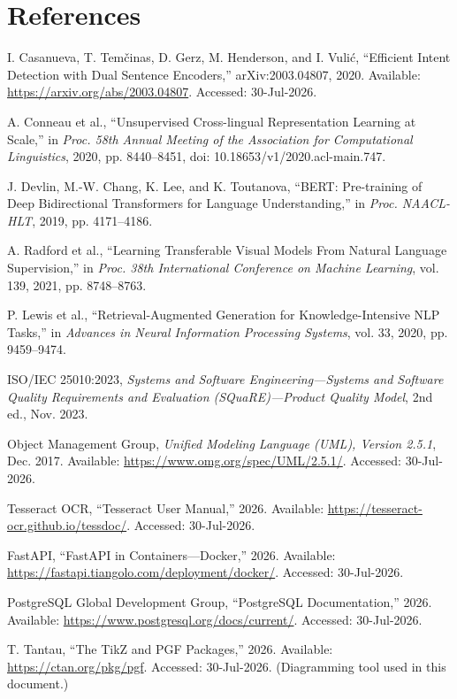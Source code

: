 \documentclass[10pt,letterpaper]{article}
\begin{document}
\section{References}
\begin{enumerate}[label={[\arabic*]},leftmargin=2.3em,itemsep=5pt]
\item I. Casanueva, T. Tem\v{c}inas, D. Gerz, M. Henderson, and I. Vuli\'c, ``Efficient Intent Detection with Dual Sentence Encoders,'' arXiv:2003.04807, 2020. Available: \url{https://arxiv.org/abs/2003.04807}. Accessed: 30-Jul-2026.
\item A. Conneau et al., ``Unsupervised Cross-lingual Representation Learning at Scale,'' in \textit{Proc. 58th Annual Meeting of the Association for Computational Linguistics}, 2020, pp. 8440--8451, doi: 10.18653/v1/2020.acl-main.747.
\item J. Devlin, M.-W. Chang, K. Lee, and K. Toutanova, ``BERT: Pre-training of Deep Bidirectional Transformers for Language Understanding,'' in \textit{Proc. NAACL-HLT}, 2019, pp. 4171--4186.
\item A. Radford et al., ``Learning Transferable Visual Models From Natural Language Supervision,'' in \textit{Proc. 38th International Conference on Machine Learning}, vol. 139, 2021, pp. 8748--8763.
\item P. Lewis et al., ``Retrieval-Augmented Generation for Knowledge-Intensive NLP Tasks,'' in \textit{Advances in Neural Information Processing Systems}, vol. 33, 2020, pp. 9459--9474.
\item ISO/IEC 25010:2023, \textit{Systems and Software Engineering---Systems and Software Quality Requirements and Evaluation (SQuaRE)---Product Quality Model}, 2nd ed., Nov. 2023.
\item Object Management Group, \textit{Unified Modeling Language (UML), Version 2.5.1}, Dec. 2017. Available: \url{https://www.omg.org/spec/UML/2.5.1/}. Accessed: 30-Jul-2026.
\item Tesseract OCR, ``Tesseract User Manual,'' 2026. Available: \url{https://tesseract-ocr.github.io/tessdoc/}. Accessed: 30-Jul-2026.
\item FastAPI, ``FastAPI in Containers---Docker,'' 2026. Available: \url{https://fastapi.tiangolo.com/deployment/docker/}. Accessed: 30-Jul-2026.
\item PostgreSQL Global Development Group, ``PostgreSQL Documentation,'' 2026. Available: \url{https://www.postgresql.org/docs/current/}. Accessed: 30-Jul-2026.
\item T. Tantau, ``The TikZ and PGF Packages,'' 2026. Available: \url{https://ctan.org/pkg/pgf}. Accessed: 30-Jul-2026. (Diagramming tool used in this document.)
\end{enumerate}
\end{document}
